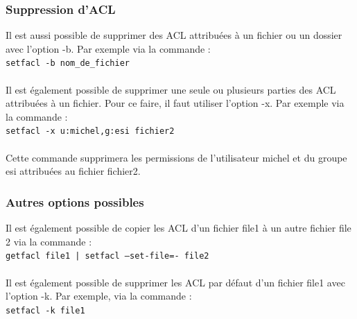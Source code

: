 \documentclass{article}
\begin{document}
\subsubsection{Suppression d'ACL}
Il est aussi possible de supprimer des ACL attribuées à un fichier ou un dossier avec l'option -b. Par exemple via la commande : \\
\texttt{setfacl -b  nom\_de\_fichier} \\\\
Il est également possible de supprimer une seule ou plusieurs parties des ACL attribuées à un fichier. Pour ce faire, il faut utiliser l'option -x. Par exemple via la commande : \\
\texttt{setfacl -x u:michel,g:esi fichier2} \\\\
Cette commande supprimera les permissions de l'utilisateur michel et du groupe esi attribuées au fichier fichier2.

\subsubsection{Autres options possibles}
Il est également possible de copier les ACL d'un fichier file1 à un autre fichier file 2 via la commande :\\
\texttt{getfacl file1 | setfacl --set-file=- file2}\\\\
Il est également possible de supprimer les ACL par défaut d'un fichier file1 avec l'option -k. Par exemple, via la commande :\\
\texttt{setfacl -k file1}
\newpage
\end{document}

